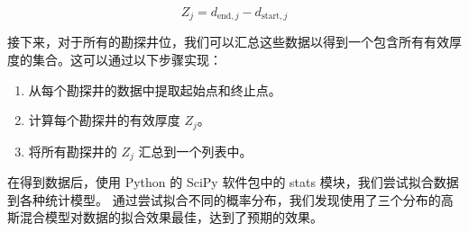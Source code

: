 \documentclass[12pt,a4paper]{nmmcm}
\begin{document}
\[
  Z_j = d_{\text{end}, j} - d_{\text{start}, j}
\]

接下来，对于所有的勘探井位，我们可以汇总这些数据以得到一个包含所有有效厚度的集合。这可以通过以下步骤实现：

\begin{enumerate}
  \item 从每个勘探井的数据中提取起始点和终止点。
  \item 计算每个勘探井的有效厚度 \(Z_j\)。
  \item 将所有勘探井的 \(Z_j\) 汇总到一个列表中。
\end{enumerate}

在得到数据后，使用 Python 的 SciPy 软件包中的 stats 模块，我们尝试拟合数据到各种统计模型。
通过尝试拟合不同的概率分布，我们发现使用了三个分布的高斯混合模型对数据的拟合效果最佳，达到了预期的效果。
\end{document}
